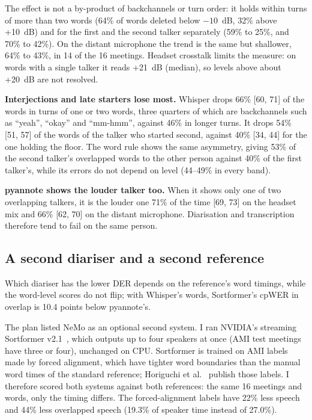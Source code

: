 \documentclass[11pt,a4paper]{article}
\let\oldsubsection\subsection
\renewcommand{\subsection}{\FloatBarrier\oldsubsection}
\begin{document}
The effect is not a by-product of backchannels or turn order: it holds within turns of more than two words (64\% of words deleted below $-10$~dB, 32\% above +10~dB) and for the first and the second talker separately (59\% to 25\%, and 70\% to 42\%). On the distant microphone the trend is the same but shallower, 64\% to 43\%, in 14 of the 16 meetings. Headset crosstalk limits the measure: on words with a single talker it reads +21~dB (median), so levels above about +20~dB are not resolved.

\textbf{Interjections and late starters lose most.} Whisper drops 66\% [60, 71] of the words in turns of one or two words, three quarters of which are backchannels such as ``yeah'', ``okay'' and ``mm-hmm'', against 46\% in longer turns. It drops 54\% [51, 57] of the words of the talker who started second, against 40\% [34, 44] for the one holding the floor. The word rule shows the same asymmetry, giving 53\% of the second talker's overlapped words to the other person against 40\% of the first talker's, while its errors do not depend on level (44--49\% in every band).

\textbf{pyannote shows the louder talker too.} When it shows only one of two overlapping talkers, it is the louder one 71\% of the time [69, 73] on the headset mix and 66\% [62, 70] on the distant microphone. Diarisation and transcription therefore tend to fail on the same person.

\subsection{A second diariser and a second reference}\label{sec:second}

Which diariser has the lower DER depends on the reference's word timings, while the word-level scores do not flip; with Whisper's words, Sortformer's cpWER in overlap is 10.4 points below pyannote's.

The plan listed NeMo as an optional second system. I ran NVIDIA's streaming Sortformer v2.1~\cite{sortformer}, which outputs up to four speakers at once (AMI test meetings have three or four), unchanged on CPU. Sortformer is trained on AMI labels made by forced alignment, which have tighter word boundaries than the manual word times of the standard reference; Horiguchi et al.~\cite{horiguchi} publish those labels. I therefore scored both systems against both references: the same 16 meetings and words, only the timing differs. The forced-alignment labels have 22\% less speech and 44\% less overlapped speech (19.3\% of speaker time instead of 27.0\%).
\end{document}
